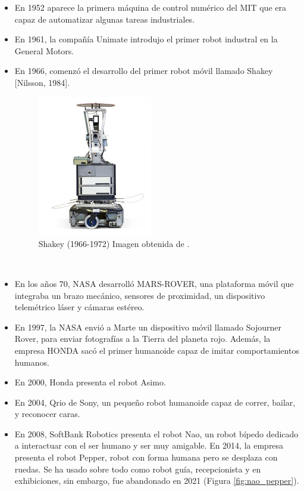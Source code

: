 \begin {itemize}
	\item En 1952 aparece la primera máquina de control numérico del MIT que era capaz de automatizar algunas tareas industriales.
	\item En 1961, la compañía Unimate introdujo el primer robot industral en la General Motors.
	\item En 1966, comenzó el desarrollo del primer robot móvil llamado Shakey [Nilsson, 1984].
	\begin{figure} [H]
	\begin{center}
	\includegraphics[width=5cm]{imagenes/cap1/shakey.jpg}
	\end{center}
	\caption[Shakey (1966-1972)]{Shakey (1966-1972) Imagen obtenida de \cite{shakey-the-robot}.}
	\label{fig:shakey}
	\end{figure}\
	\item En los años 70, NASA desarrolló MARS-ROVER, una plataforma móvil que integraba un brazo mecánico, sensores de proximidad, un dispositivo telemétrico láser y cámaras estéreo.
	\item En 1997, la NASA envió a Marte un dispositivo móvil llamado Sojourner Rover, para enviar fotografías a la Tierra del planeta rojo. Además, la empresa HONDA sacó el primer humanoide capaz de imitar comportamientos humanos.
	\item En 2000, Honda presenta el robot Asimo.
	\item En 2004, Qrio de Sony, un pequeño robot humanoide capaz de correr, bailar, y reconocer caras.
	\item En 2008, SoftBank Robotics presenta el robot Nao, un robot bípedo dedicado a interactuar con el ser humano y ser muy amigable. En 2014, la empresa presenta el robot Pepper, robot con forma humana pero se desplaza con ruedas. Se ha usado sobre todo como robot guía, recepcionista y en exhibiciones, sin embargo, fue abandonado en 2021 (Figura \ref{fig:nao_pepper}).

\end{itemize}
